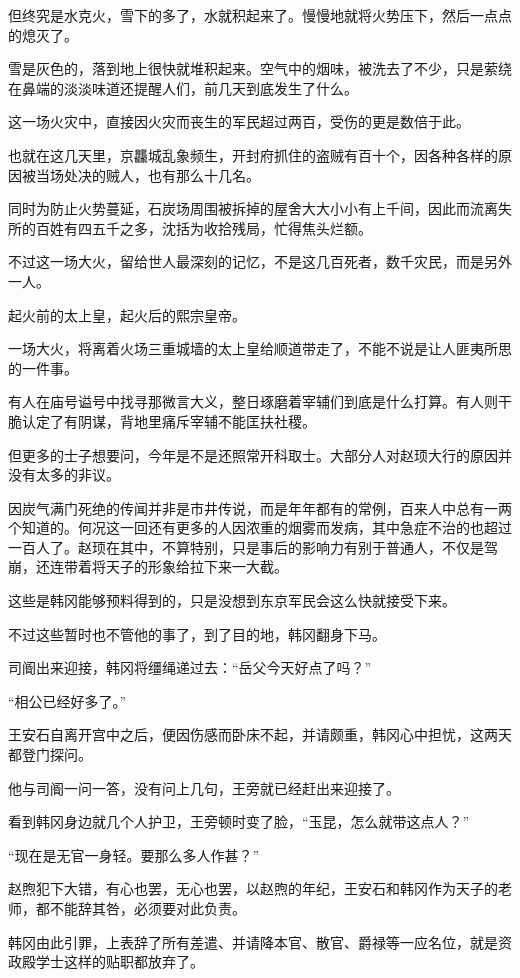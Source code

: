 但终究是水克火，雪下的多了，水就积起来了。慢慢地就将火势压下，然后一点点的熄灭了。

雪是灰色的，落到地上很快就堆积起来。空气中的烟味，被洗去了不少，只是萦绕在鼻端的淡淡味道还提醒人们，前几天到底发生了什么。

这一场火灾中，直接因火灾而丧生的军民超过两百，受伤的更是数倍于此。

也就在这几天里，京龘城乱象频生，开封府抓住的盗贼有百十个，因各种各样的原因被当场处决的贼人，也有那么十几名。

同时为防止火势蔓延，石炭场周围被拆掉的屋舍大大小小有上千间，因此而流离失所的百姓有四五千之多，沈括为收拾残局，忙得焦头烂额。

不过这一场大火，留给世人最深刻的记忆，不是这几百死者，数千灾民，而是另外一人。

起火前的太上皇，起火后的熙宗皇帝。

一场大火，将离着火场三重城墙的太上皇给顺道带走了，不能不说是让人匪夷所思的一件事。

有人在庙号谥号中找寻那微言大义，整日琢磨着宰辅们到底是什么打算。有人则干脆认定了有阴谋，背地里痛斥宰辅不能匡扶社稷。

但更多的士子想要问，今年是不是还照常开科取士。大部分人对赵顼大行的原因并没有太多的非议。

因炭气满门死绝的传闻并非是市井传说，而是年年都有的常例，百来人中总有一两个知道的。何况这一回还有更多的人因浓重的烟雾而发病，其中急症不治的也超过一百人了。赵顼在其中，不算特别，只是事后的影响力有别于普通人，不仅是驾崩，还连带着将天子的形象给拉下来一大截。

这些是韩冈能够预料得到的，只是没想到东京军民会这么快就接受下来。

不过这些暂时也不管他的事了，到了目的地，韩冈翻身下马。

司阍出来迎接，韩冈将缰绳递过去：“岳父今天好点了吗？”

“相公已经好多了。”

王安石自离开宫中之后，便因伤感而卧床不起，并请颇重，韩冈心中担忧，这两天都登门探问。

他与司阍一问一答，没有问上几句，王旁就已经赶出来迎接了。

看到韩冈身边就几个人护卫，王旁顿时变了脸，“玉昆，怎么就带这点人？”

“现在是无官一身轻。要那么多人作甚？”

赵煦犯下大错，有心也罢，无心也罢，以赵煦的年纪，王安石和韩冈作为天子的老师，都不能辞其咎，必须要对此负责。

韩冈由此引罪，上表辞了所有差遣、并请降本官、散官、爵禄等一应名位，就是资政殿学士这样的贴职都放弃了。

